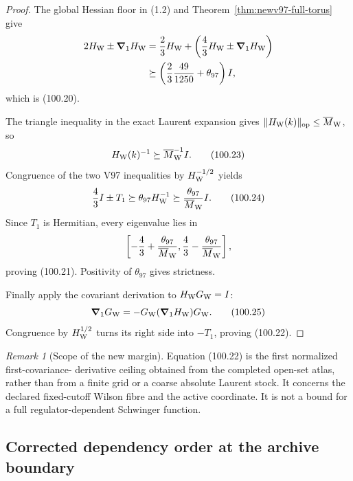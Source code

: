 \documentclass[11pt,oneside]{article}
\theoremstyle{definition}
\theoremstyle{remark}
\newtheorem{remark}[theorem]{Remark}
\begin{document}
\begin{proof}
The global Hessian floor in (1.2) and
Theorem~\ref{thm:newv97-full-torus} give
\[
\begin{split}
 2H_{\rm W}\pm{\boldsymbol\nabla}_1H_{\rm W}
 &=
 \frac23H_{\rm W}
 +\left(\frac43H_{\rm W}
 \pm{\boldsymbol\nabla}_1H_{\rm W}\right)\\
 &\succeq
 \left(\frac23\frac{49}{1250}+\theta_{97}\right)I,
\end{split}
\]
which is (100.20).

The triangle inequality in the exact Laurent expansion gives
\(\|H_{\rm W}(k)\|_{\rm op}\le\overline M_{\rm W}\), so
\[
 H_{\rm W}(k)^{-1}\succeq
 \overline M_{\rm W}^{-1}I.                         \tag{100.23}
\]
Congruence of the two V97 inequalities by
\(H_{\rm W}^{-1/2}\) yields
\[
 \frac43I\pm T_1
 \succeq\theta_{97}H_{\rm W}^{-1}
 \succeq\frac{\theta_{97}}{\overline M_{\rm W}}I.     \tag{100.24}
\]
Since \(T_1\) is Hermitian, every eigenvalue lies in
\[
 \left[-\frac43+
 \frac{\theta_{97}}{\overline M_{\rm W}},
 \frac43-\frac{\theta_{97}}{\overline M_{\rm W}}\right],
\]
proving (100.21).  Positivity of
\(\theta_{97}\) gives strictness.

Finally apply the covariant derivation to
\(H_{\rm W}G_{\rm W}=I\):
\[
 {\boldsymbol\nabla}_1G_{\rm W}
 =-G_{\rm W}({\boldsymbol\nabla}_1H_{\rm W})G_{\rm W}.
                                                               \tag{100.25}
\]
Congruence by \(H_{\rm W}^{1/2}\) turns its right side into
\(-T_1\), proving (100.22).
\end{proof}

\begin{remark}[Scope of the new margin]
\label{rem:newv100-margin-scope}
Equation (100.22) is the first normalized first-covariance-
derivative ceiling obtained from the completed open-set atlas,
rather than from a finite grid or a coarse absolute Laurent stock.
It concerns the declared fixed-cutoff Wilson fibre and the active
coordinate.  It is not a bound for a full regulator-dependent
Schwinger function.
\end{remark}

\subsection{Corrected dependency order at the archive boundary}
\end{document}
